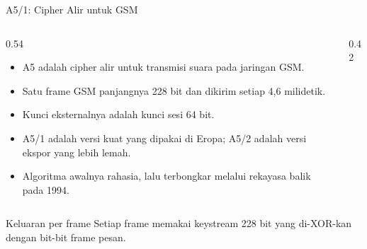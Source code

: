 \documentclass[aspectratio=169,11pt]{beamer}
\begin{document}
\begin{frame}{A5/1: Cipher Alir untuk GSM}
    \footnotesize
    \begin{columns}[T,onlytextwidth]
        \begin{column}{0.54\textwidth}
            \begin{itemize}
                \item A5 adalah cipher alir untuk transmisi suara pada
                      jaringan GSM.
                \item Satu frame GSM panjangnya 228 bit dan dikirim setiap
                      4,6 milidetik.
                \item Kunci eksternalnya adalah kunci sesi 64 bit.
                \item A5/1 adalah versi kuat yang dipakai di Eropa; A5/2
                      adalah versi ekspor yang lebih lemah.
                \item Algoritma awalnya rahasia, lalu terbongkar melalui
                      rekayasa balik pada 1994.
            \end{itemize}
        \end{column}
        \begin{column}{0.42\textwidth}
            \centering
        \end{column}
    \end{columns}
    \vspace{0.1cm}
    \begin{block}{Keluaran per frame}
        Setiap frame memakai keystream 228 bit yang di-XOR-kan dengan
        bit-bit frame pesan.
    \end{block}
\end{frame}
\end{document}
